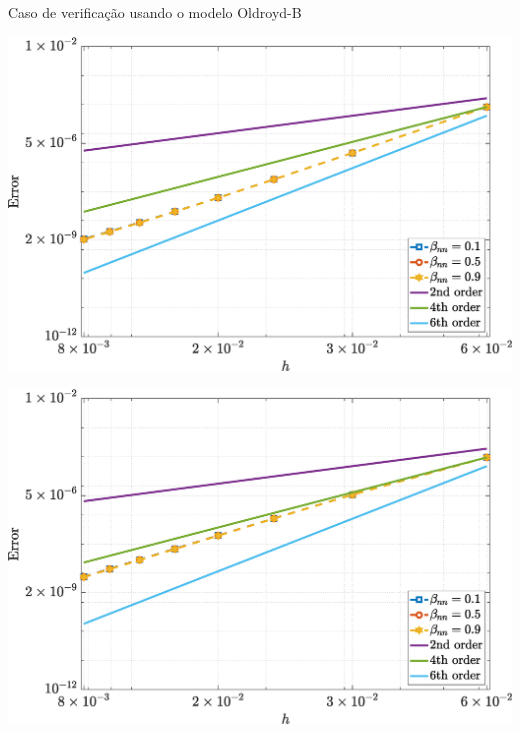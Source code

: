 \begin{frame}{Caso de verificação usando o modelo Oldroyd-B}
    \centering
    \captionsetup{justification=centering}
    \label{fig:oldroydb_1}
    \begin{minipage}{0.49\textwidth}
        \centering
        \includegraphics[width=\textwidth]{Figures/NormErr_2nd_Re_100_Wi_1_epsilon_0_xi_0_alphaG_0_Dt_1e-06_at_0.05_tipsim_1_MMS_12_U.eps}
        \label{oldroydb_u_Case11}
    \end{minipage}
    \hfill
    \begin{minipage}{0.49\textwidth}
        \centering
        \includegraphics[width=\textwidth]{Figures/NormErr_2nd_Re_100_Wi_1_epsilon_0_xi_0_alphaG_0_Dt_1e-06_at_0.05_tipsim_1_MMS_12_V.eps}
        \label{oldroydb_v_Case11}
    \end{minipage}
\end{frame}

